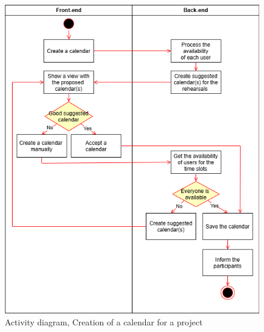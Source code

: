 \documentclass[11pt]{article}
\begin{document}
\begin{figure}[htbp!]
    \centering
    \includegraphics[scale=0.48]{calendarselection.drawio.png}
    \caption{Activity diagram, Creation of a calendar for a project}
\end{figure}
\end{document}
